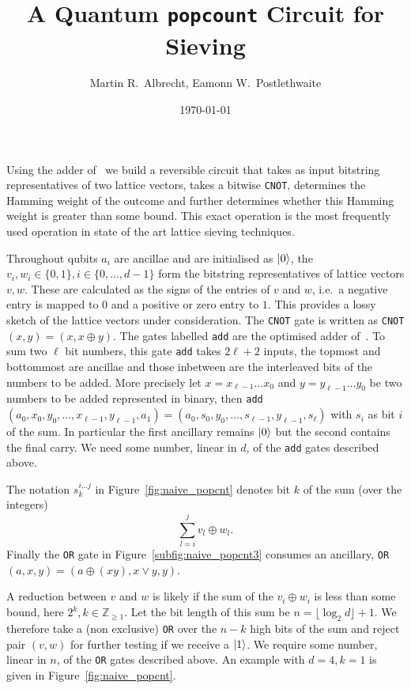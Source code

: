 \documentclass[notitlepage]{report}
\title{A Quantum \texttt{popcount} Circuit for Sieving}
\author{Martin R.~Albrecht, Eamonn W.~Postlethwaite}
\date{\today}
\theoremstyle{definition}
\begin{document}
\maketitle

Using the adder of~\cite{cuccaro2004new} we build a reversible circuit that takes as input bitstring representatives of two lattice vectors, takes a bitwise \texttt{CNOT}, determines the Hamming weight of the outcome and further determines whether this Hamming weight is greater than some bound.
This exact operation is the most frequently used operation in state of the art lattice sieving techniques.

Throughout qubits $a_{i}$ are ancillae and are initialised as $\ket{0}$, the $v_{i}, w_{i} \in \{0, 1\}, i \in \{0, \dots, d - 1\}$ form the bitstring representatives of lattice vectors $v, w$.
These are calculated as the signs of the entries of $v$ and $w$, i.e.~a negative entry is mapped to $0$ and a positive or zero entry to $1$.
This provides a lossy sketch of the lattice vectors under consideration.
The \texttt{CNOT} gate is written as \texttt{CNOT}$(x, y) = (x, x \oplus y)$.
The gates labelled \texttt{add} are the optimised adder of~\cite{cuccaro2004new}.
To sum two $\ell$ bit numbers, this gate \texttt{add} takes $2\ell + 2$ inputs, the topmost and bottommost are ancillae and those inbetween are the interleaved bits of the numbers to be added.
More precisely let $x = x_{\ell-1}\dots x_{0}$ and $y = y_{\ell-1}\dots y_{0}$ be two numbers to be added represented in binary, then \texttt{add}$(a_{0}, x_{0}, y_{0}, \dots, x_{\ell-1}, y_{\ell-1}, a_{1}) = (a_{0}, s_{0}, y_{0}, \dots, s_{\ell-1}, y_{\ell-1}, s_{\ell})$ with $s_{i}$ as bit $i$ of the sum.
In particular the first ancillary remains $\ket{0}$ but the second contains the final carry.
We need some number, linear in $d$, of the \texttt{add} gates described above.

The notation $s^{i\dots j}_{k}$ in Figure~\ref{fig:naive_popcnt} denotes bit $k$ of the sum (over the integers)
\[
    \displaystyle\sum\limits_{l=i}^{j}{v_{l} \oplus w_{l}}.
\]
Finally the \texttt{OR} gate in Figure~\ref{subfig:naive_popcnt3} consumes an ancillary, \texttt{OR}$(a, x, y) = (a \oplus (xy), x\vee y, y)$.

A reduction between $v$ and $w$ is likely if the sum of the $v_{i} \oplus w_{i}$ is less than some bound, here $2^{k}, k \in \mathbb{Z}_{\geq 1}$.
Let the bit length of this sum be $n = \lfloor\log_{2}d\rfloor + 1$.
We therefore take a (non exclusive) \texttt{OR} over the $n - k$ high bits of the sum and reject pair $(v, w)$ for further testing if we receive a $\ket{1}$.
We require some number, linear in $n$, of the \texttt{OR} gates described above.
An example with $d = 4, k = 1$ is given in Figure~\ref{fig:naive_popcnt}.
\end{document}
